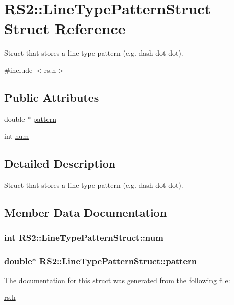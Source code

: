 \hypertarget{struct_r_s2_1_1_line_type_pattern_struct}{\section{R\-S2\-:\-:Line\-Type\-Pattern\-Struct Struct Reference}
\label{struct_r_s2_1_1_line_type_pattern_struct}
}


Struct that stores a line type pattern (e.\-g. dash dot dot).  




{\ttfamily \#include $<$rs.\-h$>$}

\subsection*{Public Attributes}
\begin{DoxyCompactItemize}
\item 
double $\ast$ \hyperlink{struct_r_s2_1_1_line_type_pattern_struct_abf844bb6830be3c038b2acae7edf3743}{pattern}
\item 
int \hyperlink{struct_r_s2_1_1_line_type_pattern_struct_a0f3d9c29ed3c04c1ecdcff44ff2201e8}{num}
\end{DoxyCompactItemize}


\subsection{Detailed Description}
Struct that stores a line type pattern (e.\-g. dash dot dot). 

\subsection{Member Data Documentation}
\hypertarget{struct_r_s2_1_1_line_type_pattern_struct_a0f3d9c29ed3c04c1ecdcff44ff2201e8}{
\subsubsection[{num}]{\setlength{\rightskip}{0pt plus 5cm}int R\-S2\-::\-Line\-Type\-Pattern\-Struct\-::num}}\label{struct_r_s2_1_1_line_type_pattern_struct_a0f3d9c29ed3c04c1ecdcff44ff2201e8}
\hypertarget{struct_r_s2_1_1_line_type_pattern_struct_abf844bb6830be3c038b2acae7edf3743}{
\subsubsection[{pattern}]{\setlength{\rightskip}{0pt plus 5cm}double$\ast$ R\-S2\-::\-Line\-Type\-Pattern\-Struct\-::pattern}}\label{struct_r_s2_1_1_line_type_pattern_struct_abf844bb6830be3c038b2acae7edf3743}


The documentation for this struct was generated from the following file\-:\begin{DoxyCompactItemize}
\item 
\hyperlink{rs_8h}{rs.\-h}\end{DoxyCompactItemize}
